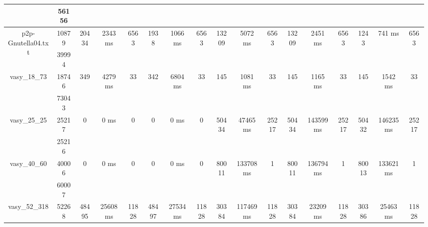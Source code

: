 \documentclass[../master/master.tex]{subfiles}
\begin{document}
\begin{center}
\begin{tabular}{ |c|c||c|c|c||c|c|c||c|c|c||c|c|c||c|c|c| }
\cline{2-2}
 & 56156  &  &  &  &  &  &  &  &  &  &  &  &  &  &  &  \\
\hline
\multirow{2}{4em}{p2p-Gnutella04.txt} & 10879 & \multirow{2}{4em}{20434} & \multirow{2}{4em}{2343 ms} & \multirow{2}{4em}{6563} & \multirow{2}{4em}{1938} & \multirow{2}{4em}{1066 ms} & \multirow{2}{4em}{6563} & \multirow{2}{4em}{13209} & \multirow{2}{4em}{5072 ms} & \multirow{2}{4em}{6563} & \multirow{2}{4em}{13209} & \multirow{2}{4em}{2451 ms} & \multirow{2}{4em}{6563} & \multirow{2}{4em}{1243} & \multirow{2}{4em}{741 ms} & \multirow{2}{4em}{6563} \\
\cline{2-2}
 & 39994  &  &  &  &  &  &  &  &  &  &  &  &  &  &  &  \\
\hline
\multirow{2}{4em}{vasy\_18\_73} & 18746 & \multirow{2}{4em}{349} & \multirow{2}{4em}{4279 ms} & \multirow{2}{4em}{33} & \multirow{2}{4em}{342} & \multirow{2}{4em}{6804 ms} & \multirow{2}{4em}{33} & \multirow{2}{4em}{145} & \multirow{2}{4em}{1081 ms} & \multirow{2}{4em}{33} & \multirow{2}{4em}{145} & \multirow{2}{4em}{1165 ms} & \multirow{2}{4em}{33} & \multirow{2}{4em}{145} & \multirow{2}{4em}{1542 ms} & \multirow{2}{4em}{33} \\
\cline{2-2}
 & 73043  &  &  &  &  &  &  &  &  &  &  &  &  &  &  &  \\
\hline
\multirow{2}{4em}{vasy\_25\_25} & 25217 & \multirow{2}{4em}{0} & \multirow{2}{4em}{0 ms} & \multirow{2}{4em}{0} & \multirow{2}{4em}{0} & \multirow{2}{4em}{0 ms} & \multirow{2}{4em}{0} & \multirow{2}{4em}{50434} & \multirow{2}{4em}{47465 ms} & \multirow{2}{4em}{25217} & \multirow{2}{4em}{50434} & \multirow{2}{4em}{143599 ms} & \multirow{2}{4em}{25217} & \multirow{2}{4em}{50432} & \multirow{2}{4em}{146235 ms} & \multirow{2}{4em}{25217} \\
\cline{2-2}
 & 25216  &  &  &  &  &  &  &  &  &  &  &  &  &  &  &  \\
\hline
\multirow{2}{4em}{vasy\_40\_60} & 40006 & \multirow{2}{4em}{0} & \multirow{2}{4em}{0 ms} & \multirow{2}{4em}{0} & \multirow{2}{4em}{0} & \multirow{2}{4em}{0 ms} & \multirow{2}{4em}{0} & \multirow{2}{4em}{80011} & \multirow{2}{4em}{133708 ms} & \multirow{2}{4em}{1} & \multirow{2}{4em}{80011} & \multirow{2}{4em}{136794 ms} & \multirow{2}{4em}{1} & \multirow{2}{4em}{80013} & \multirow{2}{4em}{133621 ms} & \multirow{2}{4em}{1} \\
\cline{2-2}
 & 60007  &  &  &  &  &  &  &  &  &  &  &  &  &  &  &  \\
\hline
\multirow{2}{4em}{vasy\_52\_318} & 52268 & \multirow{2}{4em}{48495} & \multirow{2}{4em}{25608 ms} & \multirow{2}{4em}{11828} & \multirow{2}{4em}{48497} & \multirow{2}{4em}{27534 ms} & \multirow{2}{4em}{11828} & \multirow{2}{4em}{30384} & \multirow{2}{4em}{117469 ms} & \multirow{2}{4em}{11828} & \multirow{2}{4em}{30384} & \multirow{2}{4em}{23209 ms} & \multirow{2}{4em}{11828} & \multirow{2}{4em}{30386} & \multirow{2}{4em}{25463 ms} & \multirow{2}{4em}{11828} \\

\end{tabular}
\end{center}
\end{document}
